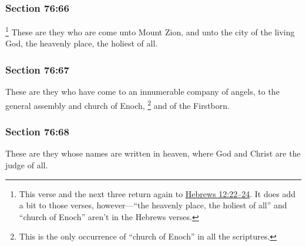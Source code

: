 	\subsubsection{Section 76:66} %
		\label{DC76-66}

			\footnote{%
				This verse and the next three return again to \hyperref[HEBREWS-12-22]{Hebrews 12:22--24}. It does add a bit to those verses, however---``the heavenly place, the holiest of all'' and ``church of Enoch'' aren't in the Hebrews verses.
				}%
		These are they who are come unto Mount Zion, and unto the city of the living God, the heavenly place, the holiest of all.


	\subsubsection{Section 76:67} %
		\label{DC76-67}

		These are they who have come to an innumerable company of angels, to the general assembly and church of Enoch,%
			\footnote{%
				This is the only occurrence of ``church of Enoch'' in all the scriptures.
				}
		and of the Firstborn.


	\subsubsection{Section 76:68} %
		\label{DC76-68}

		These are they whose names are written in heaven, where God and Christ are the judge of all.

